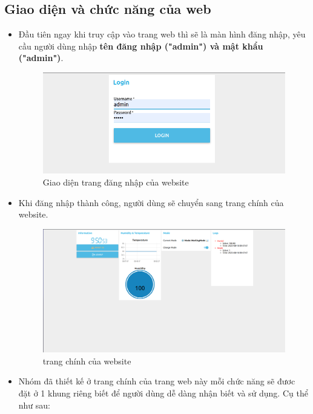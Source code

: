 \documentclass{report}
\begin{document}
\subsection{Giao diện và chức năng của web}
\begin{itemize}
    \item Đầu tiên ngay khi truy cập vào trang web thì sẽ là màn hình đăng nhập, yêu cầu người dùng nhập \textbf{tên đăng nhập ("admin") và mật khẩu ("admin")}.
    
    \begin{figure}[H]
        \includegraphics[width=\textwidth, keepaspectratio]{img/log_in_page.png}
        \centering
        \caption{Giao diện trang đăng nhập của website}
    \end{figure}
    
    \item Khi đăng nhập thành công, người dùng sẽ chuyển sang trang chính của website.
    \begin{figure}[H]
        \includegraphics[width=\textwidth, keepaspectratio]{img/web_UI.png}
        \centering
        \caption{trang chính của website}
    \end{figure}

    \item Nhóm đã thiết kế ở trang chính của trang web này mỗi chức năng sẽ đươc đặt ở 1 khung riêng biết để người dùng dễ dàng nhận biết và sử dụng. Cụ thể như sau:
    

\end{itemize}
\end{document}
